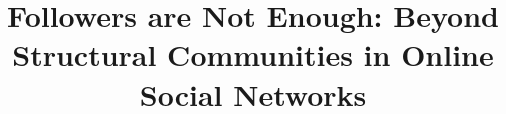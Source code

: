 \documentclass[letterpaper]{article}
\begin{document}
\title{
Followers are Not Enough: Beyond Structural Communities in Online Social Networks \\
 }

\maketitle

\begin{abstract}
\begin{quote}


\end{quote}
\end{abstract}










\end{document}
